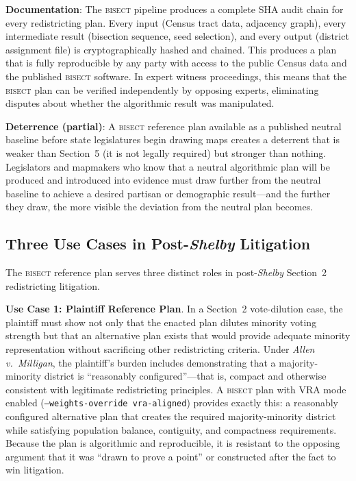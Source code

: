 \textbf{Documentation}: The \textsc{bisect} pipeline produces a complete
SHA audit chain for every redistricting plan. Every input (Census tract
data, adjacency graph), every intermediate result (bisection sequence,
seed selection), and every output (district assignment file) is
cryptographically hashed and chained. This produces a plan that is
fully reproducible by any party with access to the public Census data
and the published \textsc{bisect} software. In expert witness proceedings,
this means that the \textsc{bisect} plan can be verified independently
by opposing experts, eliminating disputes about whether the algorithmic
result was manipulated.

\textbf{Deterrence (partial)}: A \textsc{bisect} reference plan available
as a published neutral baseline before state legislatures begin drawing
maps creates a deterrent that is weaker than Section~5 (it is not
legally required) but stronger than nothing. Legislators and mapmakers
who know that a neutral algorithmic plan will be produced and introduced
into evidence must draw further from the neutral baseline to achieve
a desired partisan or demographic result---and the further they draw,
the more visible the deviation from the neutral plan becomes.

\subsection{Three Use Cases in Post-\textit{Shelby} Litigation}

The \textsc{bisect} reference plan serves three distinct roles in
post-\textit{Shelby} Section~2 redistricting litigation.

\textbf{Use Case 1: Plaintiff Reference Plan}. In a Section~2 vote-dilution
case, the plaintiff must show not only that the enacted plan dilutes
minority voting strength but that an alternative plan exists that would
provide adequate minority representation without sacrificing other
redistricting criteria. Under \textit{Allen v.\ Milligan}, the plaintiff's
burden includes demonstrating that a majority-minority district is
``reasonably configured''---that is, compact and otherwise consistent
with legitimate redistricting principles. A \textsc{bisect} plan with
VRA mode enabled (\texttt{--weights-override vra-aligned}) provides
exactly this: a reasonably configured alternative plan that creates the
required majority-minority district while satisfying population balance,
contiguity, and compactness requirements. Because the plan is algorithmic
and reproducible, it is resistant to the opposing argument that it was
``drawn to prove a point'' or constructed after the fact to win litigation.

